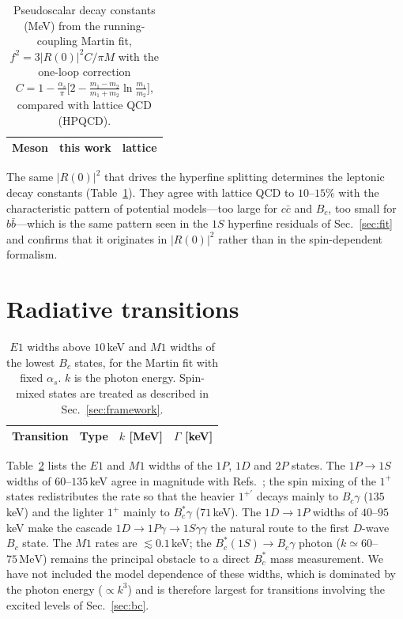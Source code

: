\documentclass[10pt,twocolumn]{article}
\newcommand{\Bc}{B_c}
\newcommand{\Bcs}{B_c^*}
\newcommand{\cc}{c\bar c}
\newcommand{\bb}{b\bar b}
\newcommand{\MeV}{\,\mathrm{MeV}}
\begin{document}
\begin{table}[t]
\caption{Pseudoscalar decay constants (MeV) from the running-coupling Martin fit, $f^2=3|R(0)|^2C/\pi M$ with the one-loop correction $C=1-\frac{\alpha_s}{\pi}\big[2-\frac{m_1-m_2}{m_1+m_2}\ln\frac{m_1}{m_2}\big]$, compared with lattice QCD (HPQCD).}
\label{tab:f}
\centering\small
\begin{tabular}{lcl}
\toprule
Meson & this work & lattice \\
\midrule

\end{tabular}
\end{table}

The same $|R(0)|^2$ that drives the hyperfine splitting determines the leptonic decay constants (Table~\ref{tab:f}).
They agree with lattice QCD to $10$--$15\%$ with the characteristic pattern of potential models---too large for $\cc$ and $\Bc$, too small for $\bb$---which is the same pattern seen in the $1S$ hyperfine residuals of Sec.~\ref{sec:fit} and confirms that it originates in $|R(0)|^2$ rather than in the spin-dependent formalism.

\section{Radiative transitions}
\label{sec:radiative}

\begin{table}[t]
\caption{$E1$ widths above $10\,$keV and $M1$ widths of the lowest $\Bc$ states, for the Martin fit with fixed $\alpha_s$. $k$ is the photon energy. Spin-mixed states are treated as described in Sec.~\ref{sec:framework}.}
\label{tab:rad}
\centering\small
\begin{tabular}{lccc}
\toprule
Transition & Type & $k$ [MeV] & $\Gamma$ [keV] \\
\midrule

\end{tabular}
\end{table}

Table~\ref{tab:rad} lists the $E1$ and $M1$ widths of the $1P$, $1D$ and $2P$ states.
The $1P\to1S$ widths of $60$--$135\,$keV agree in magnitude with Refs.~\cite{Eichten1994,BcSpectro2026}; the spin mixing of the $1^+$ states redistributes the rate so that the heavier $1^{+\prime}$ decays mainly to $\Bc\gamma$ ($135\,$keV) and the lighter $1^+$ mainly to $\Bcs\gamma$ ($71\,$keV).
The $1D\to1P$ widths of $40$--$95\,$keV make the cascade $1D\to1P\gamma\to1S\gamma\gamma$ the natural route to the first $D$-wave $\Bc$ state.
The $M1$ rates are $\lesssim0.1\,$keV; the $\Bcs(1S)\to\Bc\gamma$ photon ($k\simeq60$--$75\MeV$) remains the principal obstacle to a direct $\Bcs$ mass measurement.
We have not included the model dependence of these widths, which is dominated by the photon energy ($\propto k^3$) and is therefore largest for transitions involving the excited levels of Sec.~\ref{sec:bc}.
\end{document}
